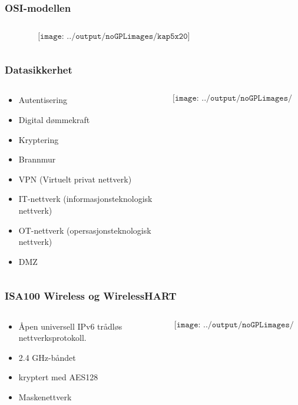 \documentclass[aspectratio=169,xcolor=dvipsnames]{beamer}
\begin{document}
\begin{frame}
	\frametitle{OSI-modellen}
	\begin{columns}
		\begin{column}{0.5\textwidth}

	$$\texttt{[image: ../output/noGPLimages/kap5x20]}$$

			
		\end{column}

		\begin{column}{0.5\textwidth}
		\end{column}
	\end{columns}
\end{frame}
\begin{frame}
	\frametitle{Datasikkerhet}
	\begin{columns}
		\begin{column}{0.5\textwidth}

			\begin{itemize}
				\item Autentisering
				\item Digital dømmekraft
				\item Kryptering
				\item Brannmur
				\item VPN (Virtuelt privat nettverk)
				\item IT-nettverk (informasjonsteknologisk nettverk)
				\item OT-nettverk (opersasjonsteknologisk nettverk)
				\item DMZ
			\end{itemize}

			
		\end{column}

		\begin{column}{0.5\textwidth}
	$$\texttt{[image: ../output/noGPLimages/kap5x26]}$$
		\end{column}
	\end{columns}
\end{frame}
\begin{frame}
	\frametitle{ISA100 Wireless og WirelessHART}
	\begin{columns}
		\begin{column}{0.5\textwidth}

			\begin{itemize}
				\item Åpen universell IPv6 trådløs nettverksprotokoll.
				\item 2.4 GHz-båndet
				\item kryptert med AES128
				\item Maskenettverk
			\end{itemize}

			
		\end{column}

		\begin{column}{0.5\textwidth}
	$$\texttt{[image: ../output/noGPLimages/kap5x31]}$$
		\end{column}
	\end{columns}
\end{frame}
\end{document}
